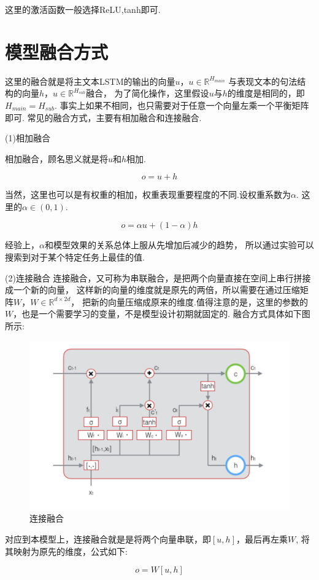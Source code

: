 \documentclass[bachelor,adobefonts]{jnuthesis}
\begin{document}
这里的激活函数一般选择ReLU,tanh即可.



\section{模型融合方式}
这里的融合就是将主文本LSTM的输出的向量$u$，$u \in \mathbb{R}^{H_{main}}$
与表现文本的句法结构的向量$h$，$u \in \mathbb{R}^{H_{sub}}$融合，
为了简化操作，这里假设$u$与$h$的维度是相同的，即$H_{main} = H_{sub}$.
事实上如果不相同，也只需要对于任意一个向量左乘一个平衡矩阵即可.
常见的融合方式，主要有相加融合和连接融合.

(1)相加融合

相加融合，顾名思义就是将$u$和$h$相加.

\begin{equation}
  o = u + h
\end{equation}

当然，这里也可以是有权重的相加，权重表现重要程度的不同.设权重系数为$\alpha$.
这里的$\alpha \in (0,1)$.

\begin{equation}
  o = \alpha u + (1-\alpha)h
\end{equation}

经验上，$\alpha$和模型效果的关系总体上服从先增加后减少的趋势，
所以通过实验可以搜索到对于某个特定任务上最佳的值.

(2)连接融合
连接融合，又可称为串联融合，是把两个向量直接在空间上串行拼接成一个新的向量，
这样新的向量的维度就是原先的两倍，所以需要在通过压缩矩阵$W$，$W \in \mathbb{R}^{d \times 2d}$，
把新的向量压缩成原来的维度.值得注意的是，这里的参数的$W$，也是一个需要学习的变量，不是模型设计初期就固定的.
融合方式具体如下图所示:
\begin{figure}[h!]
  \centering
  \includegraphics[width=0.4\linewidth]{LSTM.png}
  \caption{连接融合}
\end{figure}

对应到本模型上，连接融合就是是将两个向量串联，即$[u,h]$，最后再左乘$W$,
将其映射为原先的维度，公式如下:

\begin{equation}
  o = W[u,h]
\end{equation}
\end{document}
